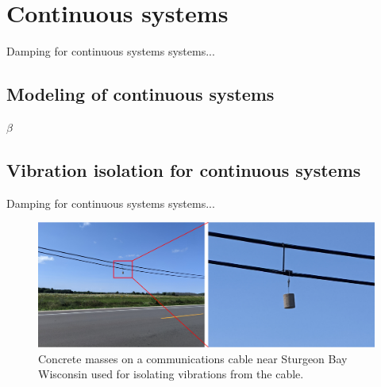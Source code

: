 \documentclass[12pt,letter]{article}
\begin{document}
	
	\setcounter{section}{7}	
	\setcounter{figure}{0}   
	\renewcommand\thefigure{\thesection.\arabic{figure}}
	\setcounter{equation}{0}   
	\renewcommand\theequation{\thesection.\arabic{equation}}

	\section{Continuous systems}

Damping for continuous systems systems...  

\subsection{Modeling of continuous systems}
	
	$\beta$


\subsection{Vibration isolation for continuous systems}

Damping for continuous systems systems...  

\begin{figure}[H]
    \centering
    \includegraphics[width=6.5in]{../figures/cable_mass}
    \caption{Concrete masses on a communications cable near Sturgeon Bay Wisconsin used for isolating vibrations from the cable.}
    \label{fig:accelerometers}
\end{figure} 
\end{document}
